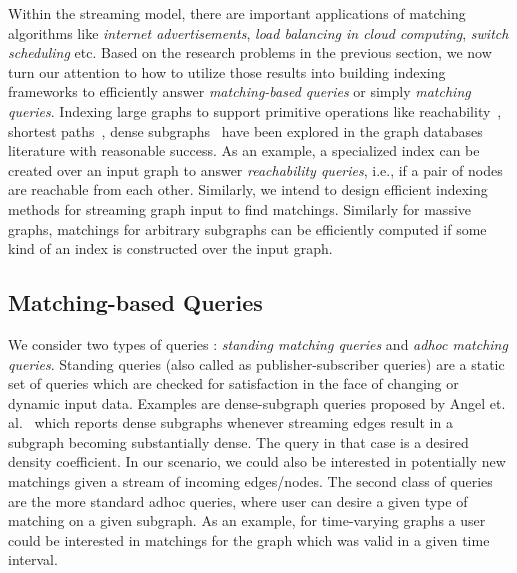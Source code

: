 Within the streaming model, there are important applications of matching algorithms like \emph{internet advertisements}, \emph{load balancing in cloud computing}, \emph{switch scheduling} etc. Based on the research problems in the previous section, we now turn our attention to how to utilize those results into building indexing frameworks to efficiently answer \emph{matching-based queries} or simply \emph{matching queries}. Indexing large graphs to support primitive operations like reachability~\cite{seufert2013ferrari}, shortest paths~\cite{Gubichev:2010}, dense subgraphs~\cite{angel_dense_2013} have been explored in the graph databases literature with reasonable success.  As an example, a specialized index can be created over an input graph to answer \emph{reachability queries}, i.e., if a pair of nodes are reachable from each other. Similarly, we intend to design efficient indexing methods for streaming graph input to find matchings. Similarly for massive graphs, matchings for arbitrary subgraphs can be efficiently computed if some kind of an index is constructed over the input graph.

\subsection{Matching-based Queries} 
We consider two types of queries : \emph{standing matching queries} and \emph{adhoc matching queries}. Standing queries (also called as publisher-subscriber queries) are a static set of queries which are checked for satisfaction in the face of changing or dynamic input data. Examples are dense-subgraph queries proposed by Angel et. al.~\cite{angel_dense_2013} which reports dense subgraphs whenever streaming edges result in a subgraph becoming substantially dense. The query in that case is a desired density coefficient. In our scenario, we could also be interested in potentially new matchings given a stream of incoming edges/nodes. The second class of queries are the more standard adhoc queries, where user can desire a given type of matching on a given subgraph. As an example, for time-varying graphs a user could be interested in matchings for the graph which was valid in a given time interval.



